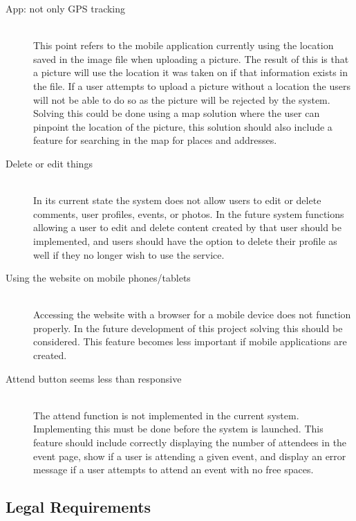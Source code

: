 \begin{description}
  \item[App: not only GPS tracking] \hfill \\ This point refers to the mobile application currently using the location saved in the image file when uploading a picture. The result of this is that a picture will use the location it was taken on if that information exists in the file. If a user attempts to upload a picture without a location the users will not be able to do so as the picture will be rejected by the system. Solving this could be done using a map solution where the user can pinpoint the location of the picture, this solution should also include a feature for searching in the map for places and addresses.
  \item[Delete or edit things] \hfill \\ In its current state the system does not allow users to edit or delete comments, user profiles, events, or photos. In the future system functions allowing a user to edit and delete content created by that user should be implemented, and users should have the option to delete their profile as well if they no longer wish to use the service.
  \item[Using the website on mobile phones/tablets] \hfill \\ Accessing the website with a browser for a mobile device does not function properly. In the future development of this project solving this should be considered. This feature becomes less important if mobile applications are created.
  \item[Attend button seems less than responsive] \hfill \\ The attend function is not implemented in the current system. Implementing this must be done before the system is launched. This feature should include correctly displaying the number of attendees in the event page, show if a user is attending a given event, and display an error message if a user attempts to attend an event with no free spaces.
\end{description}

\subsection{Legal Requirements}
\label{subsec:FurtherRequiredLegal}

